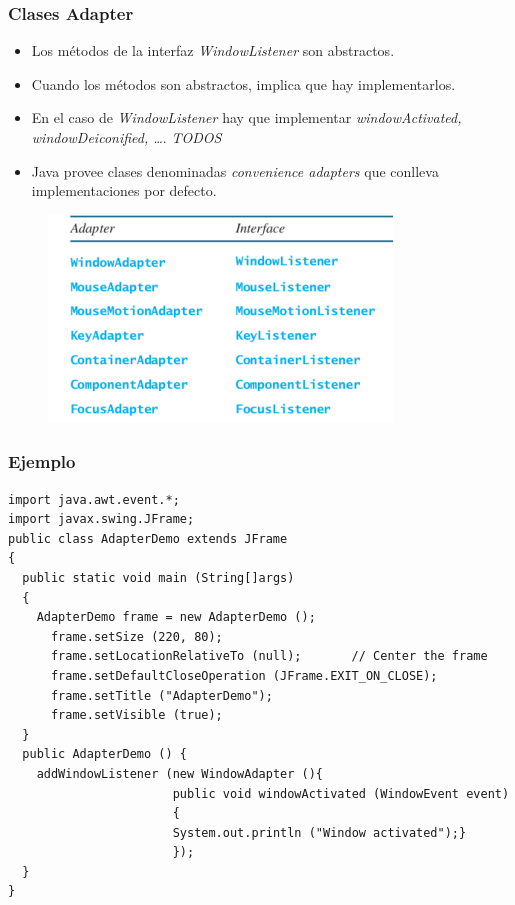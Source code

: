 \documentclass{beamer}
\begin{document}
\begin{frame}[fragile]
\frametitle{Clases Adapter}
\begin{itemize}[<+->]
\item Los métodos de la interfaz \emph{WindowListener} son abstractos.
\item Cuando los métodos son abstractos, implica que hay implementarlos.
\item En el caso de \emph{WindowListener} hay que implementar \emph{windowActivated, windowDeiconified, \dots}. \emph{TODOS}
\item Java provee clases denominadas \emph{convenience adapters} que conlleva implementaciones por defecto.
\end{itemize}
\pause
\begin{figure}
\includegraphics[scale=0.5]{imagenes/adapter.png}
\end{figure}
\end{frame}


\begin{frame}[fragile]
    \frametitle{Ejemplo}
\begin{footnotesize}
\begin{verbatim}
import java.awt.event.*;
import javax.swing.JFrame;
public class AdapterDemo extends JFrame
{
  public static void main (String[]args)
  {
    AdapterDemo frame = new AdapterDemo ();
      frame.setSize (220, 80);
      frame.setLocationRelativeTo (null);       // Center the frame
      frame.setDefaultCloseOperation (JFrame.EXIT_ON_CLOSE);
      frame.setTitle ("AdapterDemo");
      frame.setVisible (true);
  }
  public AdapterDemo () {
    addWindowListener (new WindowAdapter (){
                       public void windowActivated (WindowEvent event)
                       {
                       System.out.println ("Window activated");}
                       });
  }
}
\end{verbatim}
\end{footnotesize}
\end{frame}
\end{document}
